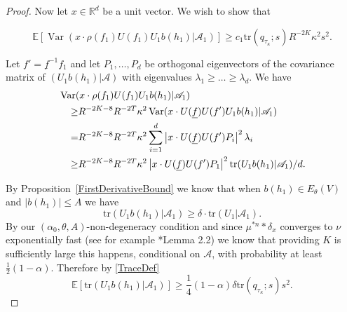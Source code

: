 \documentclass[10pt, english,oneside,reqno]{amsart}
\theoremstyle{plain}
\theoremstyle{remark}
\numberwithin{equation}{section}
\numberwithin{figure}{section}
\DeclareMathOperator{\var}{Var}
\newcommand{\tr}{\mathrm{tr}}
\newcommand{\R}{\mathbb{R}}
\begin{document}
\begin{proof}
    Now let $x \in \R^d$ be a unit vector. We wish to show that

    $$\mathbb{E}\left[\var(x \cdot \rho(f_1) U(f_1) U_1 b(h_1)| \mathscr{A}_1) \right] \geq c_1 \mathrm{tr}(q_{\tau_{\kappa}}; s) R^{-2K} \kappa^2 s^{2}.$$
    
    Let $f' = \underline{f}^{-1} f_1$ and let $P_1, \dots , P_d$ be orthogonal eigenvectors of the covariance matrix of $(U_1 b(h_1)|\mathscr{A})$ with eigenvalues $\lambda_1 \geq \dots \geq \lambda_d$. We have 
    \begin{align}
        \MoveEqLeft \var(x \cdot \rho(f_1) U(f_1) U_1 b(h_1)| \mathscr{A}_1) \nonumber \\  \geq &  R^{-2K-8} R^{-2T} \kappa^2  \var(x \cdot U(\underline{f})  U(f')  U_1 b(h_1)| \mathscr{A}_1 ) \nonumber \\
         = &R^{-2K-8} R^{-2T} \kappa^2 \sum_{i=1}^d \left| x \cdot U(\underline{f}) U(f') P_i \right|^2 \lambda_i \nonumber\\
         \geq &R^{-2K-8} R^{-2T}\kappa^2  \left| x \cdot U(\underline{f}) U(f') P_1 \right|^2 \tr(U_1 b(h_1) | \mathscr{A}_1) / d. \label{CompExp}
    \end{align}

    By Proposition~\ref{FirstDerivativeBound} we know that when $b(h_1) \in E_{\theta}(V)$ and $|b(h_1)| \leq A$ we have $$\tr(U_1 b(h_1) | \mathscr{A}_1) \geq \delta \cdot \tr (U_1| \mathscr{A}_1).$$ By our $(\alpha_0, \theta, A)$-non-degeneracy condition and since $\mu^{*n}*\delta_{x}$ converges to $\nu$ exponentially fast (see for example \cite{KittleKoglerTail}*{Lemma 2.2}) we know that providing $K$ is sufficiently large this happens, conditional on $\mathscr{A}$, with probability at least $\frac{1}{2}(1 - \alpha)$. Therefore by \eqref{TraceDef} $$\mathbb{E}[\tr(U_1 b(h_1) | \mathscr{A}_1)] \geq \frac{1}{4}(1 - \alpha) \delta \mathrm{tr}(q_{\tau_{\kappa}}; s) s^2 .$$


\end{proof}
\end{document}
